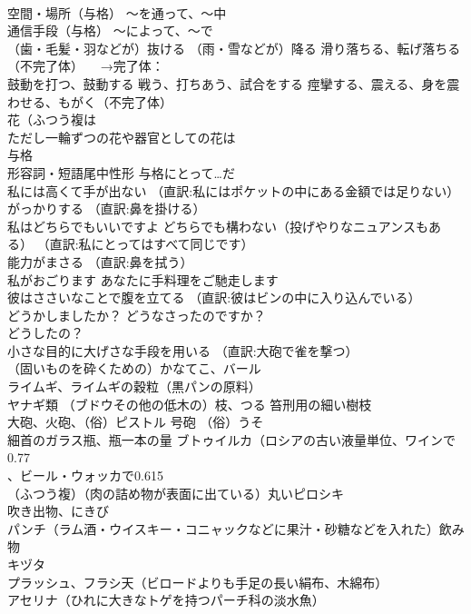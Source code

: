 \documentclass[8pt]{extreport}
\begin{document}
\begin{CJK}{UTF8}{min}
\\	空間・場所（与格）	〜を通って、〜中
\\	通信手段（与格）	〜によって、〜で
\\	（歯・毛髪・羽などが）抜ける （雨・雪などが）降る 滑り落ちる、転げ落ちる（不完了体） 　→完了体：
\\	鼓動を打つ、鼓動する 戦う、打ちあう、試合をする 痙攣する、震える、身を震わせる、もがく（不完了体）
\\	花（ふつう複は
\\	ただし一輪ずつの花や器官としての花は
\\	与格 
\\	形容詞・短語尾中性形	与格にとって…だ
\\	私には高くて手が出ない （直訳:私にはポケットの中にある金額では足りない）
\\	がっかりする （直訳:鼻を掛ける）
\\	私はどちらでもいいですよ どちらでも構わない（投げやりなニュアンスもある） （直訳:私にとってはすべて同じです）
\\	能力がまさる （直訳:鼻を拭う）
\\	私がおごります あなたに手料理をご馳走します
\\	彼はささいなことで腹を立てる （直訳:彼はビンの中に入り込んでいる）
\\	どうかしましたか？ どうなさったのですか？
\\	どうしたの？
\\	小さな目的に大げさな手段を用いる （直訳:大砲で雀を撃つ）
\\	（固いものを砕くための）かなてこ、バール
\\	ライムギ、ライムギの穀粒（黒パンの原料）
\\	ヤナギ類 （ブドウその他の低木の）枝、つる 笞刑用の細い樹枝
\\	大砲、火砲、（俗）ピストル 号砲 （俗）うそ
\\	細首のガラス瓶、瓶一本の量 ブトゥイルカ（ロシアの古い液量単位、ワインで0.77
\\	、ビール・ウォッカで0.615
\\	（ふつう複）（肉の詰め物が表面に出ている）丸いピロシキ
\\	吹き出物、にきび
\\	パンチ（ラム酒・ウイスキー・コニャックなどに果汁・砂糖などを入れた）飲み物
\\	キヅタ
\\	プラッシュ、フラシ天（ビロードよりも手足の長い絹布、木綿布）
\\	アセリナ（ひれに大きなトゲを持つパーチ科の淡水魚）

\end{CJK}
\end{document}
